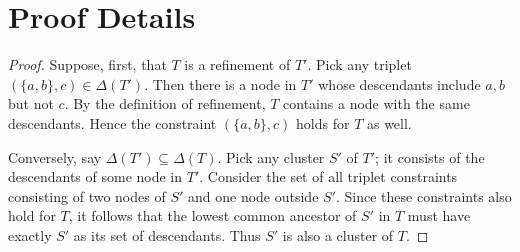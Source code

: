 \section{Proof Details}
\label{sec:ibhc-proof}

\treerefinement*
\begin{proof}

Suppose, first, that $T$ is a refinement of $T'$. Pick any triplet $(\{a,b\},c) \in \Delta(T')$. Then there is a node in $T'$ whose descendants include $a,b$ but not $c$. By the definition of refinement, $T$ contains a node with the same descendants. Hence the constraint $(\{a,b\},c)$ holds for $T$ as well.

Conversely, say $\Delta(T') \subseteq \Delta(T)$. Pick any cluster $S'$ of $T'$; it consists of the descendants of some node in $T'$. Consider the set of all triplet constraints consisting of two nodes of $S'$ and one node outside $S'$. Since these constraints also hold for $T$, it follows that the lowest common ancestor of $S'$ in $T$ must have exactly $S'$ as its set of descendants. Thus $S'$ is also a cluster of $T$.
\end{proof}

